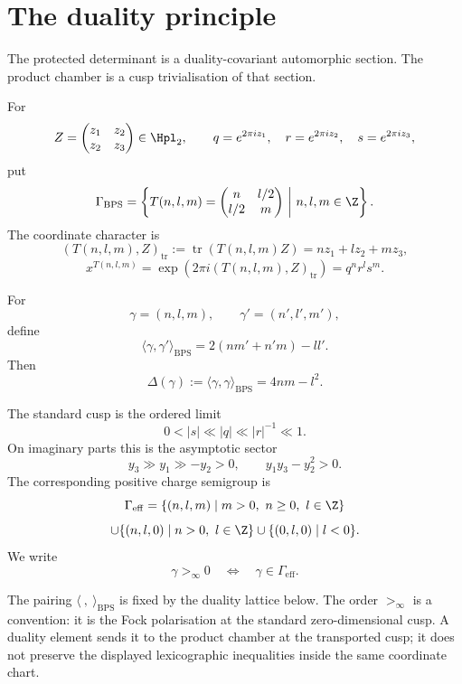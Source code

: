 \section{The duality principle}
\label{sec:duality-principle}

The protected determinant is a duality-covariant automorphic section.
The product chamber is a cusp trivialisation of that section.

For
$$
Z=\begin{pmatrix}z_1&z_2\\z_2&z_3\end{pmatrix}\in\Hpl_2,
\qquad
q=e^{2\pi iz_1},\quad r=e^{2\pi iz_2},\quad s=e^{2\pi iz_3},
$$
put
$$
\Gamma_{\mathrm{BPS}}
=\left\{
T(n,l,m)=
\begin{pmatrix}
n&l/2\\ l/2&m
\end{pmatrix}
\ \middle|\ n,l,m\in\Z
\right\}.
$$
The coordinate character is
$$
(T(n,l,m),Z)_{\mathrm{tr}}
:=\operatorname{tr}(T(n,l,m)Z)=nz_1+lz_2+mz_3,
$$
$$
x^{T(n,l,m)}=\exp(2\pi i(T(n,l,m),Z)_{\mathrm{tr}})
=q^nr^ls^m.
$$

\begin{definition}
For
$$\gamma=(n,l,m),\qquad \gamma'=(n',l',m'),$$
define
$$
\langle\gamma,\gamma'\rangle_{\mathrm{BPS}}
=2(nm'+n'm)-ll'.
$$
Then
$$
\Delta(\gamma):=\langle\gamma,\gamma\rangle_{\mathrm{BPS}}
=4nm-l^2.
$$
\end{definition}

\begin{definition}
\label{def:standard-effective-chamber}
The standard cusp is the ordered limit
$$
0<|s|\ll |q|\ll |r|^{-1}\ll 1.
$$
On imaginary parts this is the asymptotic sector
$$
y_3\gg y_1\gg -y_2>0,\qquad y_1y_3-y_2^2>0.
$$
The corresponding positive charge semigroup is
$$
\Gamma_{\mathrm{eff}}
=\{(n,l,m)\mid m>0,\ n\geq0,\ l\in\Z\}
$$
$$
\cup\{(n,l,0)\mid n>0,\ l\in\Z\}
\cup\{(0,l,0)\mid l<0\}.
$$
We write
$$
\gamma>_\infty0\quad\Longleftrightarrow\quad
\gamma\in\Gamma_{\mathrm{eff}}.
$$
\end{definition}

\begin{remark}
The pairing $\langle\ ,\ \rangle_{\mathrm{BPS}}$ is fixed by the
duality lattice below.  The order $>_\infty$ is a convention: it is the
Fock polarisation at the standard zero-dimensional cusp.  A duality
element sends it to the product chamber at the transported cusp; it does
not preserve the displayed lexicographic inequalities inside the same
coordinate chart.
\end{remark}


